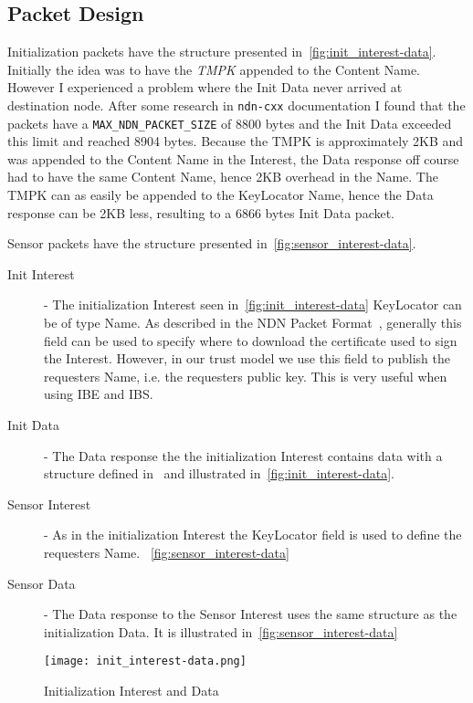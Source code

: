 \subsection{Packet Design}
Initialization packets have the structure presented in~\autoref{fig:init_interest-data}.
Initially the idea was to have the \textit{\gls{TMPK}} appended to the Content Name. 
However I experienced a problem where the Init Data never arrived at destination node. 
After some research in \texttt{ndn-cxx} documentation I found that the packets have a \texttt{MAX\_NDN\_PACKET\_SIZE} of 8800 bytes and the Init Data exceeded this limit and reached 8904 bytes.
Because the \gls{TMPK} is approximately 2\gls{KB} and was appended to the Content Name in the Interest, the Data response off course had to have the same Content Name, hence 2\gls{KB} overhead in the Name. 
The \gls{TMPK} can as easily be appended to the KeyLocator Name, hence the Data response can be 2\gls{KB} less, resulting to a 6866 bytes Init Data packet.

Sensor packets have the structure presented in~\autoref{fig:sensor_interest-data}.
\begin{description}
	\item[Init Interest] - 
  The initialization Interest seen in~\autoref{fig:init_interest-data}
  KeyLocator can be of type Name. 
  As described in the \gls{NDN} Packet Format~\cite{ndnpacketformat}, generally this field can be used to specify where to download the certificate used to sign the Interest.
  However, in our trust model we use this field to publish the requesters Name, i.e. the requesters public key. 
  This is very useful when using \gls{IBE} and \gls{IBS}.
	\item[Init Data] - 
  The Data response the the initialization Interest contains data with a structure defined in~\cite[messageBuf.proto]{garseg15} and illustrated in~\autoref{fig:init_interest-data}.
	\item[Sensor Interest] -
	As in the initialization Interest the KeyLocator field is used to define the requesters Name. ~\autoref{fig:sensor_interest-data}
	\item[Sensor Data] - 
  The Data response to the Sensor Interest uses the same structure as the initialization Data. It is illustrated in~\autoref{fig:sensor_interest-data}
\end{description}

\begin{figure}[ht]
  \centering
  \texttt{[image: init\_interest-data.png]}
  \caption{Initialization Interest and Data}
  \label{fig:init_interest-data}
\end{figure}

